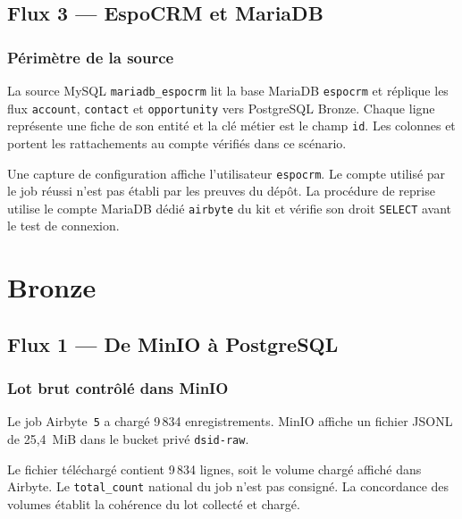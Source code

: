 \documentclass[11pt,a4paper]{article}
\newcommand{\code}[1]{\texttt{#1}}
\begin{document}
\subsection{Flux 3 --- EspoCRM et MariaDB}

\subsubsection{Périmètre de la source}

La source MySQL \code{mariadb\_espocrm} lit la base MariaDB
\code{espocrm} et réplique les flux \code{account}, \code{contact} et
\code{opportunity} vers PostgreSQL Bronze. Chaque ligne représente une
fiche de son entité et la clé métier est le champ \code{id}.
Les colonnes  et 
portent les rattachements au compte vérifiés dans ce scénario.

Une capture de configuration affiche l'utilisateur \code{espocrm}.
Le compte utilisé par le job réussi n'est pas établi par les preuves
du dépôt. La procédure de reprise utilise le compte MariaDB dédié
\code{airbyte} du kit et vérifie son droit \code{SELECT} avant le test
de connexion.

\section{Bronze}

\subsection{Flux 1 --- De MinIO à PostgreSQL}

\subsubsection{Lot brut contrôlé dans MinIO}

Le job Airbyte~\code{5} a chargé 9\,834 enregistrements. MinIO affiche
un fichier JSONL de 25,4~MiB dans le bucket privé \code{dsid-raw}.

\begin{quote}
\small
{}
\end{quote}

Le fichier téléchargé contient 9\,834 lignes, soit le volume chargé
affiché dans Airbyte. Le \code{total\_count} national du job n'est pas
consigné. La concordance des volumes établit la cohérence du lot
collecté et chargé.
\end{document}
